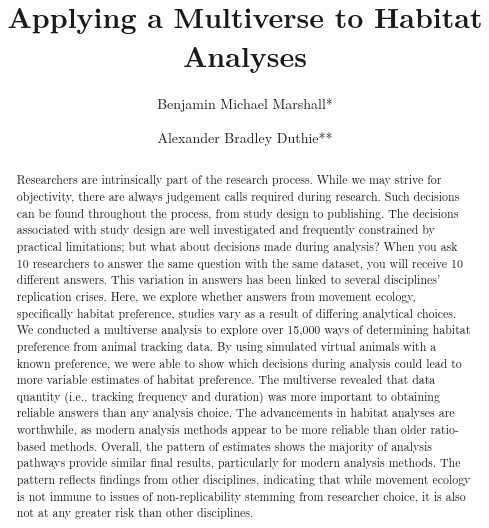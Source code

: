 \documentclass[10pt,a4paper]{article}
\begin{document}
\pagestyle{fancy}

\title{Applying a Multiverse to Habitat Analyses}
\author[1]{Benjamin Michael Marshall*}
\author[1]{Alexander Bradley Duthie**}


\maketitle
\thispagestyle{fancy}

\begin{abstract}

Researchers are intrinsically part of the research process. While we may strive for objectivity, there are always judgement calls required during research. Such decisions can be found throughout the process, from study design to publishing. The decisions associated with study design are well investigated and frequently constrained by practical limitations; but what about decisions made during analysis? When you ask 10 researchers to answer the same question with the same dataset, you will receive 10 different answers. This variation in answers has been linked to several disciplines' replication crises. Here, we explore whether answers from movement ecology, specifically habitat preference, studies vary as a result of differing analytical choices. We conducted a multiverse analysis to explore over 15,000 ways of determining habitat preference from animal tracking data. By using simulated virtual animals with a known preference, we were able to show which decisions during analysis could lead to more variable estimates of habitat preference. The multiverse revealed that data quantity (i.e., tracking frequency and duration) was more important to obtaining reliable answers than any analysis choice. The advancements in habitat analyses are worthwhile, as modern analysis methods appear to be more reliable than older ratio-based methods. Overall, the pattern of estimates shows the majority of analysis pathways provide similar final results, particularly for modern analysis methods. The pattern reflects findings from other disciplines, indicating that while movement ecology is not immune to issues of non-replicability stemming from researcher choice, it is also not at any greater risk than other disciplines.

\end{abstract}
\end{document}
